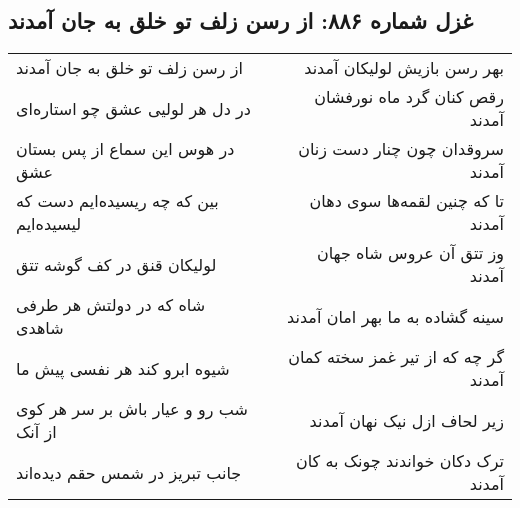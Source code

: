 \begin{center}
\section*{غزل شماره ۸۸۶: از رسن زلف تو خلق به جان آمدند}
\label{sec:0886}
\begin{longtable}{l p{0.5cm} r}
از رسن زلف تو خلق به جان آمدند
&&
بهر رسن بازیش لولیکان آمدند
\\
در دل هر لولیی عشق چو استاره‌ای
&&
رقص کنان گرد ماه نورفشان آمدند
\\
در هوس این سماع از پس بستان عشق
&&
سروقدان چون چنار دست زنان آمدند
\\
بین که چه ریسیده‌ایم دست که لیسیده‌ایم
&&
تا که چنین لقمه‌ها سوی دهان آمدند
\\
لولیکان قنق در کف گوشه تتق
&&
وز تتق آن عروس شاه جهان آمدند
\\
شاه که در دولتش هر طرفی شاهدی
&&
سینه گشاده به ما بهر امان آمدند
\\
شیوه ابرو کند هر نفسی پیش ما
&&
گر چه که از تیر غمز سخته کمان آمدند
\\
شب رو و عیار باش بر سر هر کوی از آنک
&&
زیر لحاف ازل نیک نهان آمدند
\\
جانب تبریز در شمس حقم دیده‌اند
&&
ترک دکان خواندند چونک به کان آمدند
\\
\end{longtable}
\end{center}

